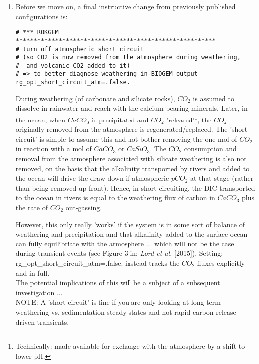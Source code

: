\begin{enumerate}[noitemsep]
\begin{verbatim}
\end{verbatim}\normalsize\vspace{-1mm}
\vspace{1mm}
\item Before we move on, a final instructive change from previously published configurations is:
\vspace{-1mm}\small\begin{verbatim}
# *** ROKGEM ********************************************************
# turn off atmospheric short circuit 
# (so CO2 is now removed from the atmosphere during weathering, 
#  and volcanic CO2 added to it)
# => to better diagnose weathering in BIOGEM output
rg_opt_short_circuit_atm=.false.
\end{verbatim}\normalsize\vspace{-1mm}
During weathering (of carbonate and silicate rocks), \(CO_{2}\) is assumed to dissolve in rainwater and reach with the calcium-bearing minerals. Later, in the ocean, when \(CaCO_{3}\) is precipitated and \(CO_{2}\) 'released'\footnote{Technically: made available for exchange with the atmosphere by a shift to lower pH.}, the \(CO_{2}\) originally removed from the atmosphere is regenerated/replaced. The 'short-circuit' is simple to assume this and not bother removing the one mol of \(CO_{2}\) in reaction with a mol of \(CaCO_{3}\) or \(CaSiO_{3}\). The \(CO_{2}\) consumption and removal from the atmosphere associated with silicate weathering is also not removed, on the basis that the alkalinity transported by rivers and added to the ocean will drive the draw-down if atmospheric \(pCO_{2}\) at that stage (rather than being removed up-front). Hence, in short-circuiting, the DIC transported to the ocean in rivers is equal to the weathering flux of carbon in \(CaCO_{3}\) plus the rate of \(CO_{2}\) out-gassing.

However, this only really 'works' if the system is in some sort of balance of weathering and precipitation and that alkalinity added to the surface ocean can fully equilibriate with the atmosphere ... which will not be the case during transient events (see Figure 3 in: \textit{Lord et al.} [2015]). Setting: \textsf{\footnotesize rg\_opt\_short\_circuit\_atm=.false.} instead tracks the \(CO_{2}\) fluxes explicitly and in full.
\\The potential implications of this will be a subject of a subsequent investigation ...
\\NOTE: A 'short-circuit' is fine if you are only looking at long-term weathering vs. sedimentation steady-states and not rapid carbon release driven transients.
\end{enumerate}

